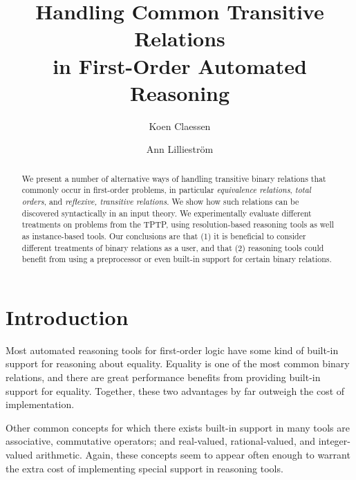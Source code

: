 \documentclass{article}
\title{Handling Common Transitive Relations\\in First-Order Automated Reasoning}
\author{
  Koen Claessen
  \and 
  Ann Lilliestr{\"o}m
}
\begin{document}
\maketitle














\begin{abstract}
We present a number of alternative ways of handling transitive binary relations that commonly occur in first-order problems, in particular {\em equivalence relations}, {\em total orders}, and {\em reflexive, transitive relations}. We show how such relations can be discovered syntactically in an input theory. We experimentally evaluate different treatments on problems from the TPTP, using resolution-based reasoning tools as well as instance-based tools. Our conclusions are that (1) it is beneficial to consider different treatments of binary relations as a user, and that (2) reasoning tools could benefit from using a preprocessor or even built-in support for certain binary relations.
\end{abstract}


\section{Introduction}

Most automated reasoning tools for first-order logic have some kind of built-in support for reasoning about equality. Equality is one of the most common binary relations, and there are great performance benefits from providing built-in support for equality. Together, these two advantages by far outweigh the cost of implementation.

Other common concepts for which there exists built-in support in many tools are associative, commutative operators; and real-valued, rational-valued, and integer-valued arithmetic. Again, these concepts seem to appear often enough to warrant the extra cost of implementing special support in reasoning tools.
\end{document}

